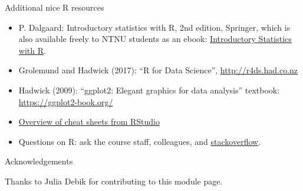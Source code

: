 \documentclass[10pt,ignorenonframetext,]{beamer}
\providecommand{\tightlist}{%
  \setlength{\itemsep}{0pt}\setlength{\parskip}{0pt}}
\begin{document}
\begin{frame}

\begin{block}{Additional nice R resources}

\vspace{2mm}

\begin{itemize}
\tightlist
\item
  P. Dalgaard: Introductory statistics with R, 2nd edition, Springer,
  which is also available freely to NTNU students as an ebook:
  \href{https://link.springer.com/book/10.1007/978-0-387-79054-1}{Introductory
  Statistics with R}.
\end{itemize}

\vspace{1mm}

\begin{itemize}
\tightlist
\item
  Grolemund and Hadwick (2017): ``R for Data Science'',
  \url{http://r4ds.had.co.nz}
\end{itemize}

\vspace{1mm}

\begin{itemize}
\tightlist
\item
  Hadwick (2009): ``ggplot2: Elegant graphics for data analysis''
  textbook: \url{https://ggplot2-book.org/}
\end{itemize}

\vspace{1mm}

\begin{itemize}
\tightlist
\item
  \href{https://www.rstudio.com/resources/cheatsheets/}{Overview of
  cheat sheets from RStudio}
\end{itemize}

\begin{itemize}
\tightlist
\item
  Questions on R: ask the course staff, colleagues, and
  \href{https://stackoverflow.com/}{stackoverflow}.
\end{itemize}

\end{block}

\end{frame}

\begin{frame}{Acknowledgements}

Thanks to Julia Debik for contributing to this module page.

\end{frame}
\end{document}
